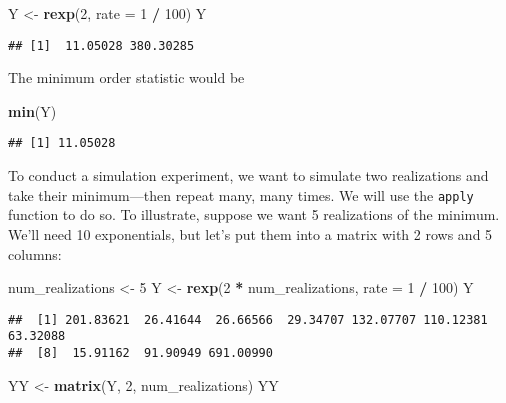 \documentclass[]{article}
\newenvironment{Shaded}{\begin{snugshade}}{\end{snugshade}}
\newcommand{\KeywordTok}[1]{\textcolor[rgb]{0.13,0.29,0.53}{\textbf{#1}}}
\newcommand{\DataTypeTok}[1]{\textcolor[rgb]{0.13,0.29,0.53}{#1}}
\newcommand{\DecValTok}[1]{\textcolor[rgb]{0.00,0.00,0.81}{#1}}
\newcommand{\StringTok}[1]{\textcolor[rgb]{0.31,0.60,0.02}{#1}}
\newcommand{\OperatorTok}[1]{\textcolor[rgb]{0.81,0.36,0.00}{\textbf{#1}}}
\newcommand{\NormalTok}[1]{#1}
\begin{document}
\begin{Shaded}
\begin{Highlighting}[]
\NormalTok{Y <-}\StringTok{ }\KeywordTok{rexp}\NormalTok{(}\DecValTok{2}\NormalTok{, }\DataTypeTok{rate =} \DecValTok{1} \OperatorTok{/}\StringTok{ }\DecValTok{100}\NormalTok{)}
\NormalTok{Y}
\end{Highlighting}
\end{Shaded}

\begin{verbatim}
## [1]  11.05028 380.30285
\end{verbatim}

The minimum order statistic would be

\begin{Shaded}
\begin{Highlighting}[]
\KeywordTok{min}\NormalTok{(Y)}
\end{Highlighting}
\end{Shaded}

\begin{verbatim}
## [1] 11.05028
\end{verbatim}

To conduct a simulation experiment, we want to simulate two realizations
and take their minimum---then repeat many, many times. We will use the
\texttt{apply} function to do so. To illustrate, suppose we want 5
realizations of the minimum. We'll need 10 exponentials, but let's put
them into a matrix with 2 rows and 5 columns:

\begin{Shaded}
\begin{Highlighting}[]
\NormalTok{num_realizations <-}\StringTok{ }\DecValTok{5}
\NormalTok{Y <-}\StringTok{ }\KeywordTok{rexp}\NormalTok{(}\DecValTok{2} \OperatorTok{*}\StringTok{ }\NormalTok{num_realizations, }\DataTypeTok{rate =} \DecValTok{1} \OperatorTok{/}\StringTok{ }\DecValTok{100}\NormalTok{)}
\NormalTok{Y}
\end{Highlighting}
\end{Shaded}

\begin{verbatim}
##  [1] 201.83621  26.41644  26.66566  29.34707 132.07707 110.12381  63.32088
##  [8]  15.91162  91.90949 691.00990
\end{verbatim}

\begin{Shaded}
\begin{Highlighting}[]
\NormalTok{YY <-}\StringTok{ }\KeywordTok{matrix}\NormalTok{(Y, }\DecValTok{2}\NormalTok{, num_realizations)}
\NormalTok{YY}
\end{Highlighting}
\end{Shaded}
\end{document}
